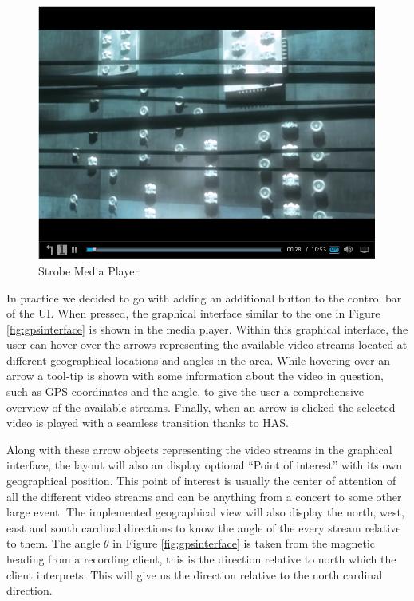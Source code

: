 \begin{figure}[ht!]
\begin{center}
	\includegraphics[scale=0.7]{Media_player.png}
	\caption{Strobe Media Player}
	\label{fig:mediaplayer}
\end{center}
\end{figure}

In practice we decided to go with adding an additional button to the control bar of the UI. When pressed, the graphical interface similar to the one in Figure \ref{fig:gpsinterface} is shown in the media player. Within this graphical interface, the user can hover over the arrows representing the available video streams located at different geographical locations and angles in the area. While hovering over an arrow a tool-tip is shown with some information about the video in question, such as GPS-coordinates and the angle, to give the user a comprehensive overview of the available streams. Finally, when an arrow is clicked the selected video is played with a seamless transition thanks to HAS.

Along with these arrow objects representing the video streams in the graphical interface, the layout will also an display optional “Point of interest” with its own geographical position. This point of interest is usually the center of attention of all the different video streams and can be anything from a concert to some other large event. The implemented geographical view will also display the north, west, east and south cardinal directions to know the angle of the every stream relative to them. The angle $\theta$ in Figure \ref{fig:gpsinterface} is taken from the magnetic heading from a recording client, this is the direction relative to north which the client interprets. This will give us the direction relative to the north cardinal direction.


